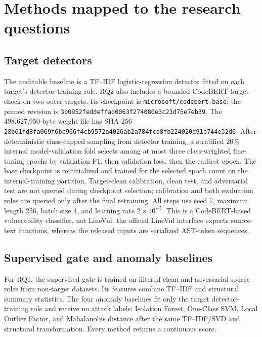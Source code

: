 \documentclass[a4paper,fleqn]{cas-dc}
\begin{document}
\section{Methods mapped to the research questions}\label{sec:methods}

\subsection{Target detectors}

\begingroup\sloppy
The auditable baseline is a TF--IDF logistic-regression detector fitted on each target's detector-training role. RQ2 also includes a bounded CodeBERT target check on two outer targets. Its checkpoint is \texttt{microsoft/\allowbreak codebert-base}; the pinned revision is \texttt{3b0952fe\allowbreak ddeffad0\allowbreak 063f2740\allowbreak 80e3c23d\allowbreak 75e7eb39}. The 498,627,950-byte weight file has SHA-256 \texttt{28b61fd8\allowbreak fa069f6b\allowbreak c966f4cb\allowbreak 9572a402\allowbreak 6ab2a784\allowbreak fca8fb22\allowbreak 4020d91b\allowbreak 744e32d6}. After deterministic class-capped sampling from detector training, a stratified 20\% internal model-validation fold selects among at most three class-weighted fine-tuning epochs by validation F1, then validation loss, then the earliest epoch. The base checkpoint is reinitialized and trained for the selected epoch count on the internal-training partition. Target-clean calibration, clean test, and adversarial test are not queried during checkpoint selection; calibration and both evaluation roles are queried only after the final retraining. All steps use seed 7, maximum length 256, batch size 4, and learning rate $2\times10^{-5}$. This is a CodeBERT-based vulnerability classifier, not LineVul: the official LineVul interface expects source-text functions, whereas the released inputs are serialized AST-token sequences.
\par\endgroup

\subsection{Supervised gate and anomaly baselines}

For RQ1, the supervised gate is trained on filtered clean and adversarial source roles from non-target datasets. Its features combine TF--IDF and structural summary statistics. The four anomaly baselines fit only the target detector-training role and receive no attack labels: Isolation Forest, One-Class SVM, Local Outlier Factor, and Mahalanobis distance after the same TF--IDF/SVD and structural transformation. Every method returns a continuous score.
\end{document}

